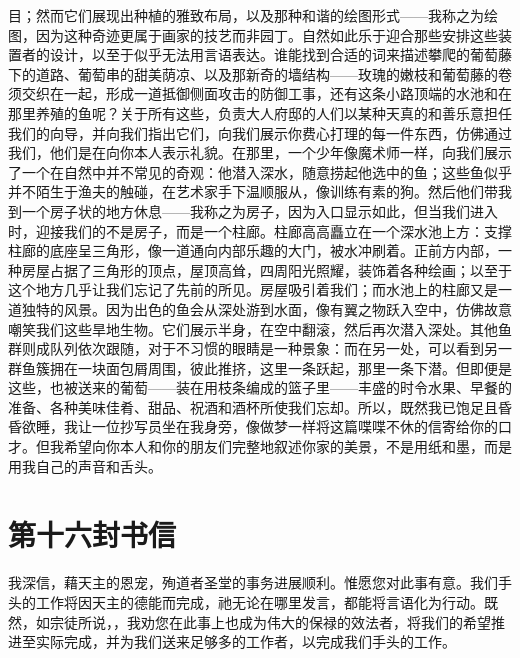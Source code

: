目；然而它们展现出种植的雅致布局，以及那种和谐的绘图形式——我称之为绘图，因为这种奇迹更属于画家的技艺而非园丁。自然如此乐于迎合那些安排这些装置者的设计，以至于似乎无法用言语表达。谁能找到合适的词来描述攀爬的葡萄藤下的道路、葡萄串的甜美荫凉、以及那新奇的墙结构——玫瑰的嫩枝和葡萄藤的卷须交织在一起，形成一道抵御侧面攻击的防御工事，还有这条小路顶端的水池和在那里养殖的鱼呢？关于所有这些，负责大人府邸的人们以某种天真的和善乐意担任我们的向导，并向我们指出它们，向我们展示你费心打理的每一件东西，仿佛通过我们，他们是在向你本人表示礼貌。在那里，一个少年像魔术师一样，向我们展示了一个在自然中并不常见的奇观：他潜入深水，随意捞起他选中的鱼；这些鱼似乎并不陌生于渔夫的触碰，在艺术家手下温顺服从，像训练有素的狗。然后他们带我到一个房子状的地方休息——我称之为房子，因为入口显示如此，但当我们进入时，迎接我们的不是房子，而是一个柱廊。柱廊高高矗立在一个深水池上方：支撑柱廊的底座呈三角形，像一道通向内部乐趣的大门，被水冲刷着。正前方内部，一种房屋占据了三角形的顶点，屋顶高耸，四周阳光照耀，装饰着各种绘画；以至于这个地方几乎让我们忘记了先前的所见。房屋吸引着我们；而水池上的柱廊又是一道独特的风景。因为出色的鱼会从深处游到水面，像有翼之物跃入空中，仿佛故意嘲笑我们这些旱地生物。它们展示半身，在空中翻滚，然后再次潜入深处。其他鱼群则成队列依次跟随，对于不习惯的眼睛是一种景象：而在另一处，可以看到另一群鱼簇拥在一块面包屑周围，彼此推挤，这里一条跃起，那里一条下潜。但即便是这些，也被送来的葡萄——装在用枝条编成的篮子里——丰盛的时令水果、早餐的准备、各种美味佳肴、甜品、祝酒和酒杯所使我们忘却。所以，既然我已饱足且昏昏欲睡，我让一位抄写员坐在我身旁，像做梦一样将这篇喋喋不休的信寄给你的口才。但我希望向你本人和你的朋友们完整地叙述你家的美景，不是用纸和墨，而是用我自己的声音和舌头。\par



\section{第十六封书信}

\par

\par

我深信，藉天主的恩宠，殉道者圣堂的事务进展顺利。惟愿您对此事有意。我们手头的工作将因天主的德能而完成，祂无论在哪里发言，都能将言语化为行动。既然，如宗徒所说，，我劝您在此事上也成为伟大的保禄的效法者，将我们的希望推进至实际完成，并为我们送来足够多的工作者，以完成我们手头的工作。\par

